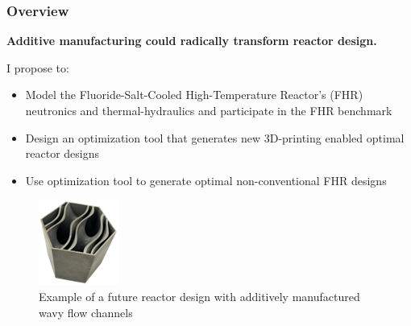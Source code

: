 \begin{frame}
    \frametitle{Overview}
    \textbf{Additive manufacturing could radically transform reactor design.}
    \vspace{0.5cm}

    I propose to: 
    \begin{itemize}
        \item Model the Fluoride-Salt-Cooled High-Temperature Reactor's (FHR)
        neutronics and thermal-hydraulics and participate in the FHR benchmark
        \item Design an optimization tool that generates new 3D-printing enabled 
        optimal reactor designs
        \item Use optimization tool to generate optimal non-conventional 
        FHR designs
    \end{itemize}
    \begin{figure}[]
        \includegraphics[width=0.2\linewidth]{figures/wavy-channels.png}
        \caption{Example of a future reactor design with additively manufactured wavy 
        flow channels}
    \end{figure}
\end{frame}